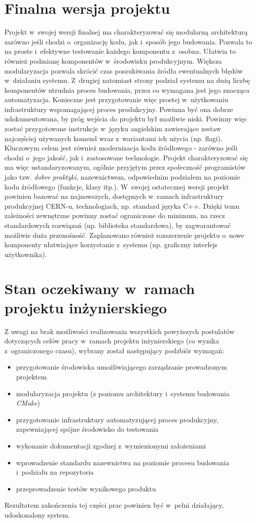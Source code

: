 \section{Finalna wersja projektu}
Projekt w~swojej wersji finalnej ma charakteryzować się modularną architekturą zarówno jeśli chodzi o~organizację kodu, jak i~sposób jego budowania. Pozwala to na proste i~efektywne testowanie każdego komponentu z~osobna. Ułatwia to również podmianę komponentów w~środowisku produkcyjnym. Większa modularyzacja pozwala skrócić czas poszukiwania źródła ewentualnych błędów w~działaniu systemu. Z~drugiej natomiast strony podział systemu na dużą liczbę komponentów utrudnia proces budowania, przez co wymagana jest jego znacząca automatyzacja. Konieczne jest przygotowanie więc prostej w~użytkowaniu infrastruktury wspomagającej proces produkcyjny. Powinna być ona dobrze udokumentowana, by próg wejścia do projektu był możliwie niski. Powinny więc zostać przygotowane instrukcje w~języku angielskim zawierające zestaw najczęściej używanych komend wraz z~wariantami ich użycia (np. flagi). Kluczowym celem jest również modernizacja kodu źródłowego - zarówno jeśli chodzi o~jego jakość, jak i~zastosowane technologie. Projekt charakteryzować się ma więc ustandaryzowanym, ogólnie przyjętym przez społeczność programistów jako tzw. \textit{dobre praktyki}, nazewnictwem, odpowiednim podziałem na poziomie kodu źródłowego (funkcje, klasy itp.). W~swojej ostatecznej wersji projekt powinien bazować na najnowszych, dostępnych w~ramach infrastruktury produkcyjnej CERN-u, technologiach, np. standard języka C++. Dzięki temu zależności zewnętrzne powinny zostać ograniczone do minimum, na rzecz standardowych rozwiązań (np. biblioteka standardowa), by zagwarantować możliwie duża przenośność. Zaplanowano również rozszerzenie projektu o~nowe komponenty ułatwiające korzystanie z~systemu (np. graficzny interfejs użytkownika).

\section{Stan oczekiwany w~ramach projektu inżynierskiego}
Z uwagi na brak możliwości realizowania wszystkich powyższych postulatów dotyczących celów pracy w~ramach projektu inżynierskiego (co wynika z~ograniczonego czasu), wybrany został następujący podzbiór wymagań:
\begin{itemize}
\item przygotowanie środowiska umożliwiającego zarządzanie prowadzonym projektem
\item modularyzacja projektu (z poziomu architektury i~systemu budowania \textit{CMake})
\item przygotowanie infrastruktury automatyzującej proces produkcyjny, zapewniającej spójne środowisko do testowania
\item wykonanie dokumentacji zgodnej z~wymienionymi założeniami
\item wprowadzenie standardu nazewnictwa na poziomie procesu budowania i~podziału na repozytoria
\item przeprowadzenie testów wynikowego produktu
\end{itemize}
Rezultatem zakończenia tej części prac powinien być w~pełni działający, udoskonalony system.


